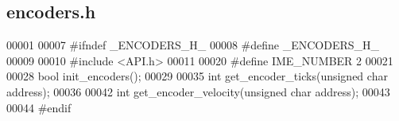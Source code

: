 \subsection{encoders.\+h}
\label{a00017_source}

\begin{DoxyCode}
00001 
00007 \textcolor{preprocessor}{#ifndef \_ENCODERS\_H\_}
00008 \textcolor{preprocessor}{#define \_ENCODERS\_H\_}
00009 
00010 \textcolor{preprocessor}{#include <API.h>}
00011 
00020 \textcolor{preprocessor}{#define IME\_NUMBER 2}
00021 
00028 \textcolor{keywordtype}{bool} init_encoders();
00029 
00035 \textcolor{keywordtype}{int} get_encoder_ticks(\textcolor{keywordtype}{unsigned} \textcolor{keywordtype}{char} address);
00036 
00042 \textcolor{keywordtype}{int} get_encoder_velocity(\textcolor{keywordtype}{unsigned} \textcolor{keywordtype}{char} address);
00043 
00044 \textcolor{preprocessor}{#endif}
\end{DoxyCode}
